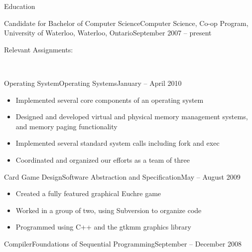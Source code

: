 \documentclass[11pt]{article}
\begin{document}
	\begin{section}{Education} \\
	
		\begin{subsection}{Candidate for Bachelor of Computer Science}{Computer Science, Co-op Program, University of Waterloo, Waterloo, Ontario}{September 2007 -- present}
		
			\begin{indent}
				\begin{bf}Relevant Assignments:\end{bf} \\
				
                \begin{subsection}{Operating System}{Operating Systems}{January -- April 2010}
				
					\begin{itemize}
						\item Implemented several core components of an operating system
                        \item Designed and developed virtual and physical memory management systems, and memory paging functionality
                        \item Implemented several standard system calls including fork and exec
                        \item Coordinated and organized our efforts as a team of three
					\end{itemize}

                \end{subsection}

				\begin{subsection}{Card Game Design}{Software Abstraction and Specification}{May -- August 2009}
				
					\begin{itemize}
						\item Created a fully featured graphical Euchre game
						\item Worked in a group of two, using Subversion to organize code
						\item Programmed using C++ and the gtkmm graphics library
					\end{itemize}
					
				\end{subsection}
				
				\begin{subsection}{Compiler}{Foundations of Sequential Programming}{September -- December 2008}
				

\end{subsection}
\end{indent}
\end{subsection}
\end{section}
\end{document}
